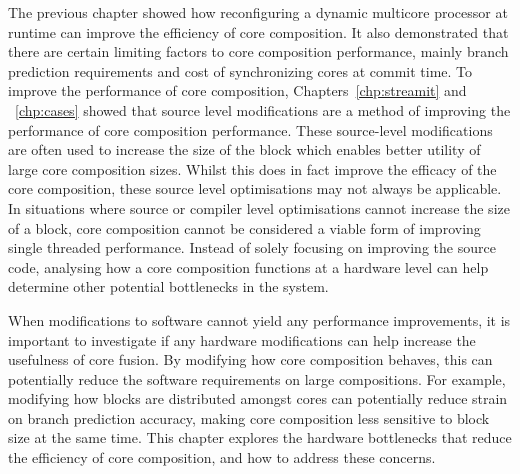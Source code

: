 The previous chapter showed how reconfiguring a dynamic multicore processor at runtime can improve the efficiency of core composition.
It also demonstrated that there are certain limiting factors to core composition performance, mainly branch prediction requirements and cost of synchronizing cores at commit time.
To improve the performance of core composition, Chapters~\ref{chp:streamit} and ~\ref{chp:cases} showed that source level modifications are a method of improving the performance of core composition performance.
These source-level modifications are often used to increase the size of the block which enables better utility of large core composition sizes.
Whilst this does in fact improve the efficacy of the core composition, these source level optimisations may not always be applicable.
In situations where source or compiler level optimisations cannot increase the size of a block, core composition cannot be considered a viable form of improving single threaded performance.
Instead of solely focusing on improving the source code, analysing how a core composition functions at a hardware level can help determine other potential bottlenecks in the system.

When modifications to software cannot yield any performance improvements, it is important to investigate if any hardware modifications can help increase the usefulness of core fusion.
By modifying how core composition behaves, this can potentially reduce the software requirements on large compositions.
For example, modifying how blocks are distributed amongst cores can potentially reduce strain on branch prediction accuracy, making core composition less sensitive to block size at the same time.
This chapter explores the hardware bottlenecks that reduce the efficiency of core composition, and how to address these concerns.

